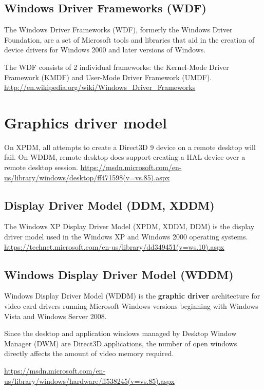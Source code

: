 \subsection{Windows Driver Frameworks (WDF)}
\label{sec:WDF}

The Windows Driver Frameworks (WDF), formerly the Windows Driver Foundation, are
a set of Microsoft tools and libraries that aid in the creation of device
drivers for Windows 2000 and later versions of Windows.

The WDF consists of 2 individual frameworks: the Kernel-Mode Driver Framework
(KMDF) and User-Mode Driver Framework (UMDF).
\url{http://en.wikipedia.org/wiki/Windows_Driver_Frameworks}


\section{Graphics driver model}
 
On XPDM, all attempts to create a Direct3D 9 device on a remote desktop will fail.
On WDDM, remote desktop does support creating a HAL device over a remote desktop session.
\url{https://msdn.microsoft.com/en-us/library/windows/desktop/ff471598(v=vs.85).aspx}
 
\subsection{Display Driver Model (DDM, XDDM)}
\label{sec:DDM}

The Windows XP Display Driver Model (XPDM, XDDM, DDM) is the display driver model used in
the Windows XP and Windows 2000 operating systems.
\url{https://technet.microsoft.com/en-us/library/dd349451(v=ws.10).aspx}


\subsection{Windows Display Driver Model (WDDM)}
\label{sec:WDDM}

Windows Display Driver Model (WDDM) is the {\bf graphic driver} architecture for
video card drivers running Microsoft Windows versions beginning with Windows
Vista and Windows Server 2008.

Since the desktop and application windows managed by  Desktop Window Manager (DWM) are Direct3D
applications, the number of open windows directly affects the amount of video
memory required.

\url{https://msdn.microsoft.com/en-us/library/windows/hardware/ff538245(v=vs.85).aspx}

